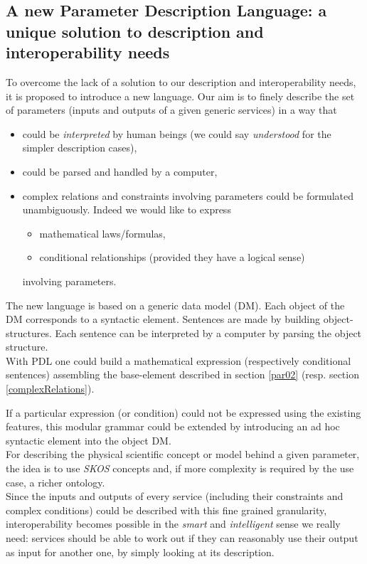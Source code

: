 \documentclass[a4paper,11pt] {ivoa}
\begin{document}
\subsection{A new Parameter Description Language: a unique solution to description and interoperability needs}
To overcome the lack of a solution to our description and interoperability
needs, it is proposed to introduce a new language.
Our aim is to finely describe the set of parameters (inputs and outputs of a given generic services)
in a way that
\begin{itemize}
\item could be {\it interpreted} by human beings (we could say {\it understood} for the simpler description cases),
\item could be parsed and handled by a computer,
\item complex relations and constraints involving parameters could be formulated unambiguously.
Indeed we would like to express
\begin{itemize}
\item mathematical laws/formulas,
\item conditional relationships (provided they have a logical sense)
\end{itemize}
involving parameters.
\end{itemize}
The new language is based on a generic data model (DM). Each object of the DM corresponds to a
syntactic element. Sentences are made by building object-structures.
Each sentence can be interpreted by a computer by parsing the object structure.\\

With PDL one could build a mathematical expression (respectively conditional sentences) assembling the base-element described in section \ref{par02} (resp. section \ref{complexRelations}). 

If a particular expression (or condition) could not be expressed using the existing features,
this modular grammar could be extended by introducing an ad hoc syntactic element into the object DM. \\

For describing the physical scientific concept or model behind a given parameter, the idea is to use
{\it SKOS} concepts and, if more complexity is required by the use case, a richer ontology.\\

Since the inputs and outputs  of every service (including their constraints and complex conditions)
could be described with this fine grained granularity, interoperability becomes possible in the {\it
smart} and {\it intelligent} sense we really need: services should be able to work out if they can
reasonably use their output as input for another one, by simply looking at its description.\\
\end{document}
